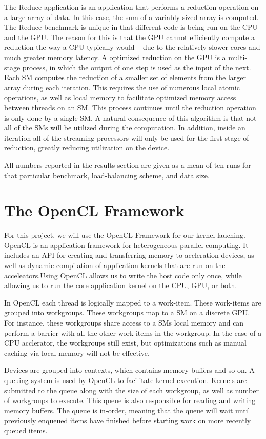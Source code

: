 \documentclass[journal]{IEEEtran}
\begin{document}
The Reduce application is an application that performs a reduction operation on a
large array of data.  In this case, the sum of a variably-sized array is computed.
The Reduce benchmark is unique in that different code is being run on the CPU and 
the GPU.  The reason for this is that the GPU cannot efficiently compute a reduction
the way a CPU typically would -- due to the relatively slower cores and much greater
memory latency.  A optimized reduction on the GPU is a multi-stage process, in which the
output of one step is used as the input of the next.  Each SM computes the reduction
of a smaller set of elements from the larger array during each iteration.  This
requires the use of numerous local atomic operations, as well as local memory to 
facilitate optimized memory access between threads on an SM.
This process continues until the reduction operation is only done by a single SM.
A natural consequence of this algorithm is that not all of the SMs will be utilized during
the computation.  In addition, inside an iteration all of the streaming processors
will only be used for the first stage of reduction, greatly reducing utilization on the
device.

All numbers reported in the results section
are given as a mean of ten runs for that particular benchmark, load-balancing scheme,
and data size.

\section{The OpenCL Framework}
For this project, we will use the OpenCL Framework for our kernel lauching.  OpenCL
is an application framework for heterogeneous parallel computing.  It includes an
API for creating and transferring memory to accleration devices, as well as dynamic
compilation of application kernels that are run on the acceleators.Using OpenCL 
allows us to write the host code only once, while allowing us to run the core 
application kernel on the CPU, GPU, or both.

In OpenCL each thread is logically mapped to a work-item.  These work-items are grouped into
workgroups.  These workgroups map to a SM on a discrete GPU.  For instance, these workgroups
share access to a SMs local memory and can perform a barrier with all the other work-items
in the workgroup.  In the case of a CPU acclerator, the workgroups still exist, but optimizations
such as manual caching via local memory will not be effective.

Devices are grouped into contexts, which contains memory buffers and so on.  A queuing system
is used by OpenCL to facilitate kernel execution.  Kernels are submitted to the queue along with
the size of each workgroup, as well as number of workgroups to execute.  This queue is also 
responsible for reading and writing memory buffers.  The queue is in-order, meaning that 
the queue will wait until previously enqueued items have finished before starting work 
on more recently queued items.
\end{document}
